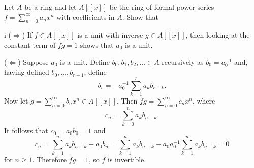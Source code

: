 \begin{exercise}
Let \(A\) be a ring and let \(A[[x]]\) be the ring of formal power series \(f = \sum_{n=0}^\infty a_n x^n\) with coefficients in \(A\).
Show that
\end{exercise}

\begin{partsolution}{1}{5}{i}
(\(\Rightarrow\))
If \(f\in A[[x]]\) is a unit with inverse \(g\in A[[x]]\), then looking at the constant term of \(f g = 1\) shows that \(a_0\) is a unit.

(\(\Leftarrow\))
Suppose \(a_0\) is a unit.
Define \(b_0, b_1, b_2, \ldots \in A\) recursively as \(b_0 = a_0^{-1}\) and, having defined \(b_0,\ldots,b_{r-1}\), define
\begin{equation*}
b_r = -a_0^{-1}\sum_{k=1}^r a_k b_{r-k}.
\end{equation*}
Now let \(g = \sum_{n=0}^\infty b_n x^n \in A[[x]]\).
Then \(f g = \sum_{n=0}^\infty c_n x^n\), where
\begin{equation*}
c_n = \sum_{k=0}^n a_k b_{n-k}.
\end{equation*}
It follows that \(c_0 = a_0 b_0 = 1\) and
\begin{equation*}
c_n
= \sum_{k=1}^n a_k b_{n-k} + a_0 b_n
= \sum_{k=1}^n a_k b_{n-k} - a_0 a_0^{-1} \sum_{k=1}^n a_k b_{n-k}
= 0
\end{equation*}
for \(n \geq 1\).
Therefore \(f g = 1\), so \(f\) is invertible.
\end{partsolution}

